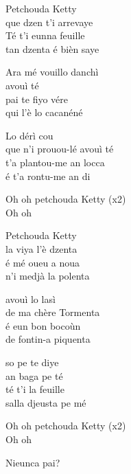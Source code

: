 \begin{drama}
{\begin{center}
Petchouda Ketty\\
que dzen t'i arrevaye\\
Té t'i eunna feuille\\
tan dzenta é bièn saye\\\vspace{0.15cm}

Ara mé vouillo danchì\\
avouì té\\
pai te fiyo vére\\
qui l'è lo cacanéné\\\vspace{0.15cm}

Lo dérì cou\\
que n'i prouou-lé avouì té\\
t'a plantou-me an locca\\
é t'a rontu-me an di\\\vspace{0.15cm}

Oh oh petchouda Ketty (x2)\\
Oh oh\\\vspace{0.15cm}

Petchouda Ketty\\
la viya l'è dzenta\\
é mé oueu a noua\\
n'i medjà la polenta\\\vspace{0.15cm}

avouì lo lasì\\
de ma chère Tormenta\\
é eun bon bocoùn\\
de fontin-a piquenta\\\vspace{0.15cm}

so pe te diye\\
an baga pe té\\
té t'i la feuille\\
salla djeusta pe mé\\\vspace{0.15cm}

Oh oh petchouda Ketty (x2)\\
Oh oh
\end{center}
 }
 

\Selmospeaks{} Nieunca pai?


\end{drama}
